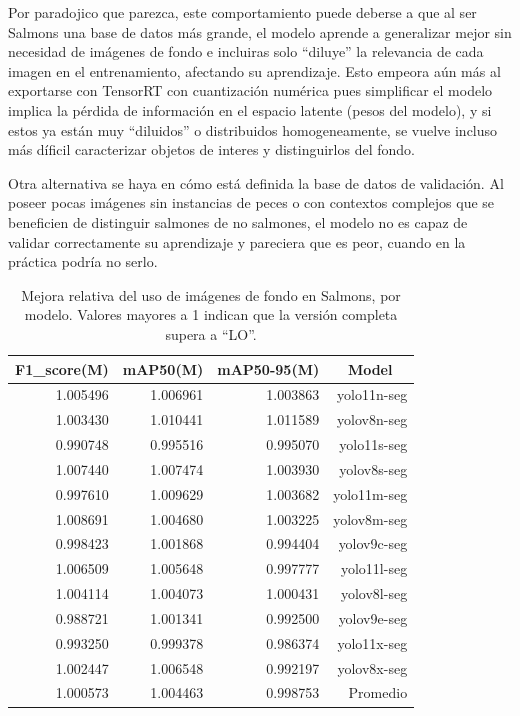 Por paradojico que parezca, este comportamiento puede deberse a que al ser Salmons una base de datos más grande, el modelo aprende a generalizar mejor sin necesidad de imágenes de fondo e incluiras solo ``diluye'' la relevancia de cada imagen en el entrenamiento, afectando su aprendizaje. Esto empeora aún más al exportarse con TensorRT con cuantización numérica pues simplificar el modelo implica la pérdida de información en el espacio latente (pesos del modelo), y si estos ya están muy ``diluidos'' o distribuidos homogeneamente, se vuelve incluso más díficil caracterizar objetos de interes y distinguirlos del fondo.

Otra alternativa se haya en cómo está definida la base de datos de validación. Al poseer pocas imágenes sin instancias de peces o con contextos complejos que se beneficien de distinguir salmones de no salmones, el modelo no es capaz de validar correctamente su aprendizaje y pareciera que es peor, cuando en la práctica podría no serlo.

\begin{table}[htbp]
\centering
\caption[Mejora relativa del uso de imágenes de fondo en Salmons, por modelo]{Mejora relativa del uso de imágenes de fondo en Salmons, por modelo. Valores mayores a 1 indican que la versión completa supera a ``LO''.}
\label{tab:salmons_mejoraRelativa_model}
\begin{tabular}{|r|r|r|r|}
\hline
\multicolumn{1}{|c|}{\textbf{F1\_score(M)}} & \multicolumn{1}{c|}{\textbf{mAP50(M)}} & \multicolumn{1}{c|}{\textbf{mAP50-95(M)}} & \multicolumn{1}{c|}{\textbf{Model}} \\ \hline
1.005496 & 1.006961 & 1.003863 & yolo11n-seg \\ \hline
1.003430 & 1.010441 & 1.011589 & yolov8n-seg \\ \hline
0.990748 & 0.995516 & 0.995070 & yolo11s-seg \\ \hline
1.007440 & 1.007474 & 1.003930 & yolov8s-seg \\ \hline
0.997610 & 1.009629 & 1.003682 & yolo11m-seg \\ \hline
1.008691 & 1.004680 & 1.003225 & yolov8m-seg \\ \hline
0.998423 & 1.001868 & 0.994404 & yolov9c-seg \\ \hline
1.006509 & 1.005648 & 0.997777 & yolo11l-seg \\ \hline
1.004114 & 1.004073 & 1.000431 & yolov8l-seg \\ \hline
0.988721 & 1.001341 & 0.992500 & yolov9e-seg \\ \hline
0.993250 & 0.999378 & 0.986374 & yolo11x-seg \\ \hline
1.002447 & 1.006548 & 0.992197 & yolov8x-seg \\ \hline
1.000573 & 1.004463 & 0.998753 & Promedio \\ \hline
\end{tabular}
\end{table}

